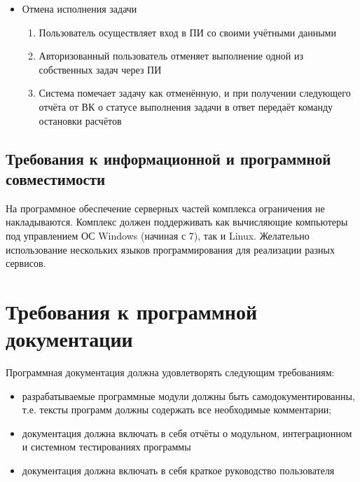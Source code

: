 \documentclass[a4paper,12pt]{report}
\numberwithin{equation}{section}
\begin{document}
\begin{itemize}
    \item Отмена исполнения задачи
    \begin{enumerate}
        \item Пользователь осуществляет вход в ПИ со своими учётными данными
        \item Авторизованный пользователь отменяет выполнение одной из собственных задач через ПИ
        \item Система помечает задачу как отменённую, и при получении следующего отчёта от ВК о статусе выполнения задачи в ответ передаёт команду остановки расчётов
    \end{enumerate}
\end{itemize}

\subsection{Требования к информационной и программной совместимости}
На программное обеспечение серверных частей комплекса ограничения не накладываются.
Комплекс должен поддерживать как вычисляющие компьютеры под управлением ОС Windows (начиная с 7), так и Linux.
Желательно использование нескольких языков программирования для реализации разных сервисов.

\section{Требования к программной документации}
Программная документация должна удовлетворять следующим требованиям:
\begin{itemize}
  \item разрабатываемые программные модули должны быть самодокументированны, т.е. тексты программ должны содержать все необходимые комментарии;
  \item документация должна включать в себя отчёты о модульном, интеграционном и системном тестированиях программы
  \item документация должна включать в себя краткое руководство пользователя
\end{itemize}
\end{document}

